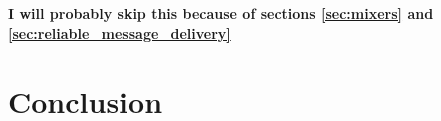 \documentclass[a4paper,11pt,oneside]{report}
\begin{document}

\textbf{I will probably skip this because of sections \autoref{sec:mixers} and \autoref{sec:reliable_message_delivery}}

\chapter{Conclusion}


\cleardoublepage
{}
{}
\printbibliography

%
%
\end{document}
